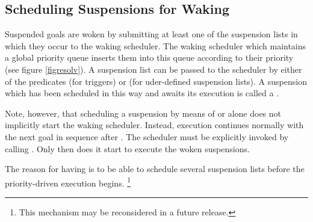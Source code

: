 \subsection{Scheduling Suspensions for Waking}
\label{secwaking}%
Suspended goals are woken by submitting at least one of the suspension lists
in which they occur to the waking scheduler.
The waking scheduler which maintains a global priority queue inserts
them into this queue according to their priority (see figure \ref{figresolv}).
A suspension list can be passed to the scheduler by either of the predicates
(for triggers)
or
(for uder-defined suspension lists).
A suspension which has been scheduled in this way and awaits
its execution is called a
.

Note, however, that scheduling a suspension by means of
or
alone does not implicitly start the waking scheduler.
Instead, execution continues normally with the next goal in sequence after
.
The scheduler must be explicitly invoked by calling
.
Only then does it start to execute the woken suspensions.

The reason for having 
is to be able to schedule several suspension lists before the
priority-driven execution begins.%
\footnote{This mechanism may be reconsidered in a future release.}



